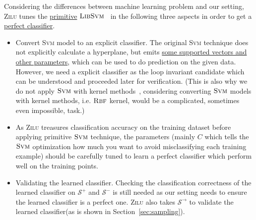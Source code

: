 Considering the differences between machine learning problem and our setting, 
\textsc{Zilu} tunes the \underline{primitive} $\textsc{LibSvm}$~\cite{chang2011libsvm} in the following three aspects in order to get a \underline{perfect classifier}. 
\begin{itemize}
\item Convert \textsc{Svm} model to an explicit classifier.
The original \textsc{Svm} technique does not explicitly calculate a hyperplane, but emits \underline{some supported vectors and other parameters}, 
which can be used to do prediction on the given data.
However, we need a explicit classifier as the loop invariant candidate which can be understood and proceeded later for verification.
(This is also why we do not apply $\textsc{Svm}$ with kernel methods~\cite{yu2009evolving},
considering converting $\textsc{Svm}$ models with kernel methods, i.e. $\textsc{Rbf}$ kernel, would be a complicated, sometimes even impossible, task.)

\item As \textsc{Zilu} treasures classification accuracy on the training dataset%
before applying primitive $\textsc{Svm}$ technique, the parameters 
(mainly $C$ which tells the $\textsc{Svm}$ optimization how much you want to avoid misclassifying each training example)
should be carefully tuned to learn a perfect classifier which perform well on the training points.

\item Validating the learned classifier. 
Checking the classification correctness of the learned classifier 
on $\mathcal{S}^+$ and $\mathcal{S}^-$ is still needed as our setting needs to ensure the learned classifier is a perfect one.
\textsc{Zilu} also takes $\mathcal{S}^\rightarrow$ to validate the learned classifier(as is shown in Section~\ref{sec:sampling}).
\end{itemize} 

